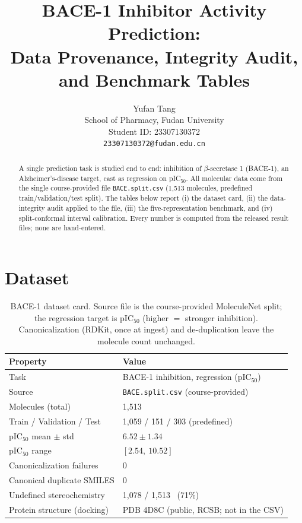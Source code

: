 \documentclass{article}
\title{BACE-1 Inhibitor Activity Prediction:\\ Data Provenance, Integrity Audit, and Benchmark Tables}
\author{%
  Yufan Tang \\
  School of Pharmacy, Fudan University \\
  Student ID: 23307130372 \\
  \texttt{23307130372@fudan.edu.cn}
}
\begin{document}
\maketitle

\begin{abstract}
A single prediction task is studied end to end: inhibition of $\beta$-secretase 1
(BACE-1), an Alzheimer's-disease target, cast as regression on pIC$_{50}$. All
molecular data come from the single course-provided file \texttt{BACE.split.csv}
(1{,}513 molecules, predefined train/validation/test split). The tables below
report (i) the dataset card, (ii) the data-integrity audit applied to the file,
(iii) the five-representation benchmark, and (iv) split-conformal interval
calibration. Every number is computed from the released result files; none are
hand-entered.
\end{abstract}

\section{Dataset}
\begin{table}[h]
  \centering
  \caption{BACE-1 dataset card. Source file is the course-provided MoleculeNet
  split; the regression target is pIC$_{50}$ (higher $=$ stronger inhibition).
  Canonicalization (RDKit, once at ingest) and de-duplication leave the molecule
  count unchanged.}
  \label{tab:dataset}
  \small
  \begin{tabular}{ll}
    \toprule
    \textbf{Property} & \textbf{Value} \\
    \midrule
    Task                         & BACE-1 inhibition, regression (pIC$_{50}$) \\
    Source                       & \texttt{BACE.split.csv} (course-provided) \\
    Molecules (total)            & 1{,}513 \\
    Train / Validation / Test    & 1{,}059 / 151 / 303 (predefined) \\
    pIC$_{50}$ mean $\pm$ std    & $6.52 \pm 1.34$ \\
    pIC$_{50}$ range             & $[2.54,\ 10.52]$ \\
    Canonicalization failures    & 0 \\
    Canonical duplicate SMILES   & 0 \\
    Undefined stereochemistry    & 1{,}078 / 1{,}513 \ (71\%) \\
    Protein structure (docking)  & PDB 4D8C (public, RCSB; not in the CSV) \\
    \bottomrule
  \end{tabular}
\end{table}
\end{document}
